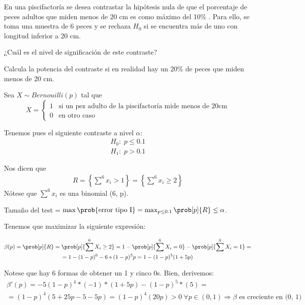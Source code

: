 \begin{problem}[2]

En una piscifactoría se desea contrastar la hipótesis nula de que el porcentaje de peces adultos que miden menos de 20 cm es como máximo del 10\% . Para ello, se toma una muestra de 6 peces y se rechaza $H_0$ si se encuentra más de uno con longitud inferior a 20 cm.

\ppart ¿Cuál es el nivel de significación de este contraste?

\ppart Calcula la potencia del contraste si en realidad hay un 20\% de peces que miden menos de 20 cm.

\solution

Sea $X \sim Bernouilli(p)$ tal que
\[
X = \begin{cases}
1 & \text{si un pez adulto de la piscifactoría mide menos de 20cm} \\
0 & \text{en otro caso}
\end{cases}
\]

Tenemos pues el siguiente contraste a nivel $\alpha$:
\begin{gather*}
H_0: \; p \leq 0.1\\
H_1: \; p > 0.1
\end{gather*}

Nos dicen que
\begin{gather*}
R = \left\{ \sum\limits^6 x_i > 1 \right\} =
\left\{ \sum\limits^6 x_i \geq 2 \right\}
\end{gather*}
Nótese que $\sum\limits^6 x_i$ es una binomial (6, p).

\spart
Tamaño del test = $\max \prob{ \text{error tipo I} } = \max_{p \leq 0.1} \prob[p]{R} \leq \alpha$.

Tenemos que maximizar la siguiente expresión:

\begin{gather*}
\beta(p) =
\prob[p]{R} =
\prob[p]{\sum\limits^6 X_i \geq 2} =
1 - \prob[p]{\sum\limits^6 X_i = 0} - \prob[p]{\sum\limits^6 X_i = 1} =\\
= 1 - (1 - p)^6 - 6*(1 - p)^5 p =
1 - (1 - p)^5 (1 + 5p)
\end{gather*}

Notese que hay 6 formas de obtener un 1 y cinco 0s. Bien, derivemos:
\begin{gather*}
\beta'(p) = -5 (1 - p)^4 * (-1) * (1 + 5p) - (1 - p)^5 * (5) =\\
= (1 - p)^4 (5 + 25p - 5 - 5p) =
(1 - p)^4 (20p) > 0 \; \forall p \in (0, 1)
\Rightarrow \beta \text{ es creciente en (0, 1)}
\end{gather*}


\end{problem}
